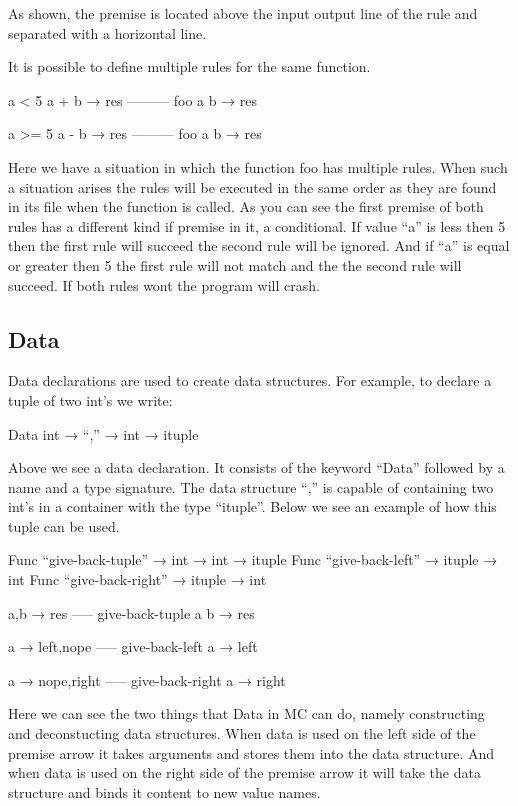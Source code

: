 As shown, the premise is located above the input output line of the rule and separated with a horizontal line.  

It is possible to define multiple rules for the same function.

\begin{code}
	a < 5
	a + b → res
	---------
	foo a b → res 
	
	a >= 5
	a - b → res
	---------
	foo a b → res 
\end{code}

Here we have a situation in which the function foo has multiple rules. 
When such a situation arises the rules will be executed in the same order as they are found in its file when the function is called.  
As you can see the first premise of both rules has a different kind if premise in it, a conditional. 
If value “a” is less then 5 then the first rule will succeed the second rule will be ignored. 
And if “a” is equal or greater then 5 the first rule will not match and the the second rule will succeed. 
If both rules wont the program will crash.


\subsection{Data}

Data declarations are used to create data structures. For example, to declare a tuple of two int’s we write:

\begin{code}
	Data int →  “,” → int → ituple
\end{code}

Above we see a data declaration. 
It consists of the keyword “Data” followed by a name and a type signature. 
The data structure “,” is capable of containing two int’s in a container with the type “ituple”. 
Below we see an example of how this tuple can be used.


\begin{code}
	Func “give-back-tuple” → int → int → ituple
	Func “give-back-left” → ituple → int
	Func “give-back-right” → ituple → int
	
	a,b → res
	-----
	give-back-tuple a b → res
	
	a → left,nope
	-----
	give-back-left a → left
	
	a → nope,right
	-----
	give-back-right a → right
\end{code}

Here we can see the two things that Data in MC can do, namely constructing and deconstucting data structures. 
When data is used on the left side of the premise arrow it takes arguments and stores them into the data structure.  
And when data is used on the right side of the premise arrow it will take the data structure and binds it content to new value names.     

